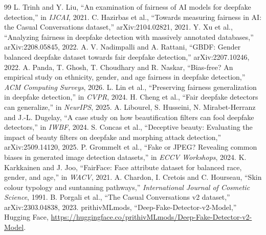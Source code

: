 \documentclass[11pt]{article}
\begin{document}
\begin{thebibliography}{99}
\small
{} L. Trinh and Y. Liu, ``An examination of fairness of AI models for deepfake detection,'' in \emph{IJCAI}, 2021.
 C. Hazirbas et al., ``Towards measuring fairness in AI: the Casual Conversations dataset,'' arXiv:2104.02821, 2021.
 Y. Xu et al., ``Analyzing fairness in deepfake detection with massively annotated databases,'' arXiv:2208.05845, 2022.
 A. V. Nadimpalli and A. Rattani, ``GBDF: Gender balanced deepfake dataset towards fair deepfake detection,'' arXiv:2207.10246, 2022.
 A. Panda, T. Ghosh, T. Choudhary and R. Naskar, ``Bias-free? An empirical study on ethnicity, gender, and age fairness in deepfake detection,'' \emph{ACM Computing Surveys}, 2026.
 L. Lin et al., ``Preserving fairness generalization in deepfake detection,'' in \emph{CVPR}, 2024.
 H. Cheng et al., ``Fair deepfake detectors can generalize,'' in \emph{NeurIPS}, 2025.
 A. Libourel, S. Husseini, N. Mirabet-Herranz and J.-L. Dugelay, ``A case study on how beautification filters can fool deepfake detectors,'' in \emph{IWBF}, 2024.
 S. Concas et al., ``Deceptive beauty: Evaluating the impact of beauty filters on deepfake and morphing attack detection,'' arXiv:2509.14120, 2025.
 P. Grommelt et al., ``Fake or JPEG? Revealing common biases in generated image detection datasets,'' in \emph{ECCV Workshops}, 2024.
 K. Karkkainen and J. Joo, ``FairFace: Face attribute dataset for balanced race, gender, and age,'' in \emph{WACV}, 2021.
 A. Chardon, I. Cretois and C. Hourseau, ``Skin colour typology and suntanning pathways,'' \emph{International Journal of Cosmetic Science}, 1991.
 B. Porgali et al., ``The Casual Conversations v2 dataset,'' arXiv:2303.04838, 2023.
 prithivMLmods, ``Deep-Fake-Detector-v2-Model,'' Hugging Face, \url{https://huggingface.co/prithivMLmods/Deep-Fake-Detector-v2-Model}.
\end{thebibliography}
\end{document}

